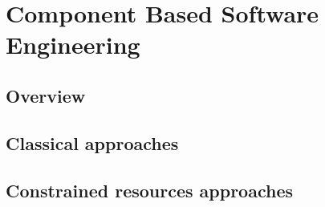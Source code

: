 \chapter{Component Based Software Engineering}
\label{sec:CBSE}

\section{Overview}

\section{Classical approaches}

\section{Constrained resources approaches}